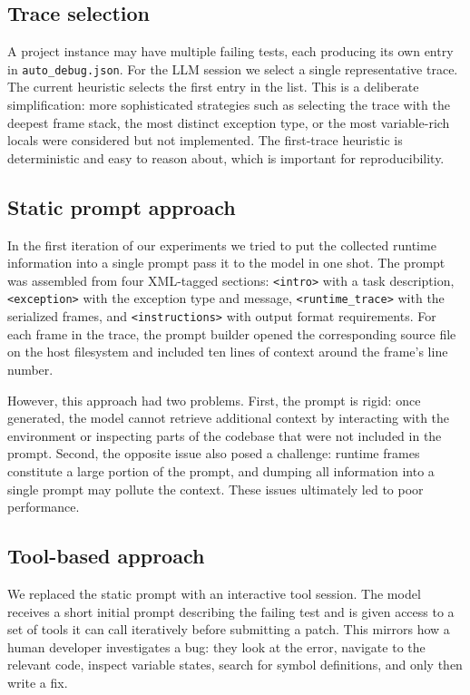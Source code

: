 \subsection{Trace selection}
\label{subsec:trace-selection}

A project instance may have multiple failing tests, each producing its own entry in \texttt{auto\_debug.json}. For the LLM session we select a single representative trace. The current heuristic selects the first entry in the list. This is a deliberate simplification: more sophisticated strategies such as selecting the trace with the deepest frame stack, the most distinct exception type, or the most variable-rich locals were considered but not implemented. The first-trace heuristic is deterministic and easy to reason about, which is important for reproducibility.

\subsection{Static prompt approach}
\label{subsec:static-prompt}

In the first iteration of our experiments we tried to put the collected runtime information into a single prompt pass it to the model in one shot. The prompt was assembled from four XML-tagged sections: \texttt{<intro>} with a task description, \texttt{<exception>} with the exception type and message, \texttt{<runtime\_trace>} with the serialized frames, and \texttt{<instructions>} with output format requirements. For each frame in the trace, the prompt builder opened the corresponding source file on the host filesystem and included ten lines of context around the frame's line number.

However, this approach had two problems. First, the prompt is rigid: once generated, the model cannot retrieve additional context by interacting with the environment or inspecting parts of the codebase that were not included in the prompt. Second, the opposite issue also posed a challenge: runtime frames constitute a large portion of the prompt, and dumping all information into a single prompt may pollute the context. These issues ultimately led to poor performance.

\subsection{Tool-based approach}
\label{subsec:tool-based}

We replaced the static prompt with an interactive tool session. The model receives a short initial prompt describing the failing test and is given access to a set of tools it can call iteratively before submitting a patch. This mirrors how a human developer investigates a bug: they look at the error, navigate to the relevant code, inspect variable states, search for symbol definitions, and only then write a fix.

